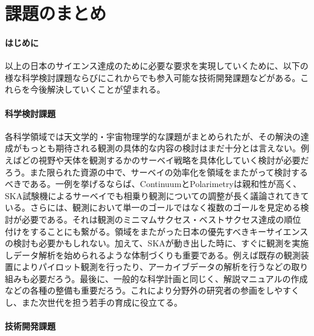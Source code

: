 \setcounter{section}{1}\section{課題のまとめ}
\label{c10.s2}
\paragraph{はじめに}

以上の日本のサイエンス達成のために必要な要求を実現していくために、以下の様な科学検討課題ならびにこれからでも参入可能な技術開発課題などがある。これらを今後解決していくことが望まれる。

\paragraph{科学検討課題}

各科学領域では天文学的・宇宙物理学的な課題がまとめられたが、その解決の達成がもっとも期待される観測の具体的な内容の検討はまだ十分とは言えない。例えばどの視野や天体を観測するかのサーベイ戦略を具体化していく検討が必要だろう。また限られた資源の中で、サーベイの効率化を領域をまたがって検討するべきである。一例を挙げるならば、ContinuumとPolarimetryは親和性が高く、SKA試験機によるサーベイでも相乗り観測についての調整が長く議論されてきている。さらには、観測において単一のゴールではなく複数のゴールを見定める検討が必要である。それは観測のミニマムサクセス・ベストサクセス達成の順位付けをすることにも繋がる。領域をまたがった日本の優先すべきキーサイエンスの検討も必要かもしれない。加えて、SKAが動き出した時に、すぐに観測を実施しデータ解析を始められるような体制づくりも重要である。例えば既存の観測装置によりパイロット観測を行ったり、アーカイブデータの解析を行うなどの取り組みも必要だろう。最後に、一般的な科学計画と同じく、解説マニュアルの作成などの各種の整備も重要だろう。これにより分野外の研究者の参画をしやすくし、また次世代を担う若手の育成に役立てる。

\paragraph{技術開発課題}

